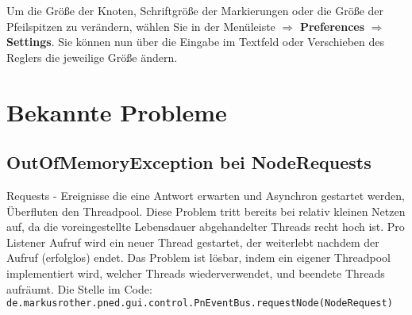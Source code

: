 \documentclass[11pt]{article}
\begin{document}
   Um die Größe der Knoten, Schriftgröße der Markierungen oder die
   Größe der Pfeilspitzen zu verändern, wählen Sie in der Menüleiste
   $\Rightarrow$ \textbf{Preferences} $\Rightarrow$ \textbf{Settings}. Sie können nun
   über die Eingabe im Textfeld oder Verschieben des Reglers die
   jeweilige Größe ändern.
\section{Bekannte Probleme}
\label{sec-3}
\subsection{OutOfMemoryException bei NodeRequests}
\label{sec-3-1}


   Requests - Ereignisse die eine Antwort erwarten und Asynchron
   gestartet werden, Überfluten den Threadpool.  Diese Problem tritt
   bereits bei relativ kleinen Netzen auf, da die voreingestellte
   Lebensdauer abgehandelter Threads recht hoch ist.  Pro Listener
   Aufruf wird ein neuer Thread gestartet, der weiterlebt nachdem der
   Aufruf (erfolglos) endet. Das Problem ist lösbar, indem ein eigener
   Threadpool implementiert wird, welcher Threads wiederverwendet, und
   beendete Threads aufräumt. Die Stelle im Code:
   \verb|de.markusrother.pned.gui.control.PnEventBus.requestNode(NodeRequest)|
   

    
\end{document}
